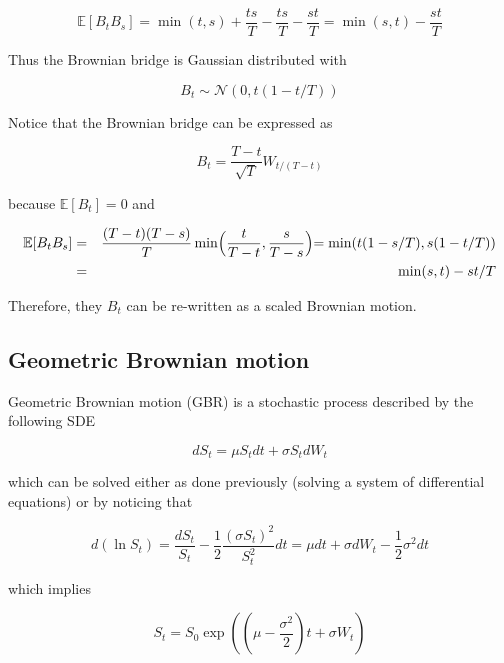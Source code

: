 \documentclass[11pt,a4paper]{article}
\begin{document}
\begin{equation}
    \mathbb{E}[B_tB_{s}] = \min(t,s) + \frac{ts}{T}-\frac{ts}{T}-\frac{st}{T} = \min(s,t)-\frac{st}{T}
\end{equation}

Thus the Brownian bridge is Gaussian distributed with 

\begin{equation}
    B_t \sim \mathcal{N}(0, t(1-t/T))
\end{equation}

Notice that the Brownian bridge can be expressed as

\begin{equation}
    B_t = \frac{T-t}{\sqrt{T}}W_{t/(T-t)}
\end{equation}

because $\mathbb{E}[B_t] = 0$ and

\begin{eqnarray}
 \mathbb{E}[B_tB_s] &=& \frac{(T-t)(T-s)}{T}\min \Bigl(\frac{t}{T-t},\frac{s}{T-s}\Bigl) = \min(t(1-s/T),s(1-t/T)) \nonumber \\ &=& \min(s,t)-st/T 
\end{eqnarray}

Therefore, they $B_t$ can be re-written as a scaled Brownian motion.

\subsection{Geometric Brownian motion}

Geometric Brownian motion (GBR) is a stochastic process described by the following SDE

\begin{equation}
    dS_t = \mu S_t dt + \sigma S_t dW_t
\end{equation}

which can be solved either as done previously (solving a system of differential equations) or by noticing that

\begin{equation}
    d(\ln S_t) = \frac{dS_t}{S_t}-\frac{1}{2}\frac{(\sigma S_t)^2}{S^2_t}dt = \mu dt + \sigma dW_t-\frac{1}{2}\sigma^2dt
\end{equation}

which implies

\begin{equation}
    S_t = S_0\exp \left((\mu- \frac{\sigma^2}{2})t + \sigma W_t \right)
\end{equation}
\end{document}
